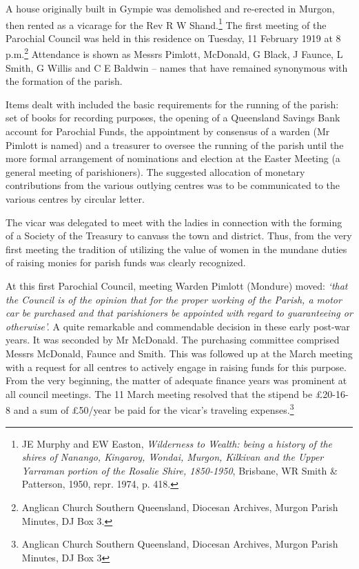 A house originally built in Gympie was demolished and re-erected in Murgon, then rented as a vicarage for the Rev R W Shand.\footnote{JE Murphy and EW Easton, \emph{Wilderness to Wealth: being a history of the shires of Nanango, Kingaroy, Wondai, Murgon, Kilkivan and the Upper Yarraman portion of the Rosalie Shire, 1850-1950}, Brisbane, WR Smith \& Patterson, 1950, repr. 1974, p. 418.} The first meeting of the Parochial Council was held in this residence on Tuesday, 11 February 1919 at 8 p.m.\footnote{Anglican Church Southern Queensland, Diocesan Archives, Murgon Parish Minutes, DJ Box 3.} Attendance is shown as Messrs Pimlott, McDonald, G Black, J Faunce, L Smith, G Willis and C E Baldwin -- names that have remained synonymous with the formation of the parish.


Items dealt with included the basic requirements for the running of the parish: set of books for recording purposes, the opening of a Queensland Savings Bank account for Parochial Funds, the appointment by consensus of a warden (Mr Pimlott is named) and a treasurer to oversee the running of the parish until the more formal arrangement of nominations and election at the Easter Meeting (a general meeting of parishioners). The suggested allocation of monetary contributions from the various outlying centres was to be communicated to the various centres by circular letter.



The vicar was delegated to meet with the ladies in connection with the forming of a Society of the Treasury to canvass the town and district. Thus, from the very first meeting the tradition of utilizing the value of women in the mundane duties of raising monies for parish funds was clearly recognized.



At this first Parochial Council, meeting Warden Pimlott (Mondure) moved: \emph{`that the Council is of the opinion that for the proper working of the Parish, a motor car be purchased and that parishioners be appointed with regard to guaranteeing or otherwise'.} A quite remarkable and commendable decision in these early post-war years. It was seconded by Mr McDonald. The purchasing committee comprised Messrs McDonald, Faunce and Smith. This was followed up at the March meeting with a request for all centres to actively engage in raising funds for this purpose. From the very beginning, the matter of adequate finance years was prominent at all council meetings. The 11 March meeting resolved that the stipend be \pounds20-16-8 and a sum of \pounds50/year be paid for the vicar's traveling expenses.\footnote{Anglican Church Southern Queensland, Diocesan Archives, Murgon Parish Minutes, DJ Box 3}


